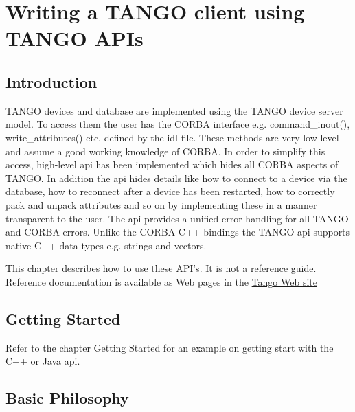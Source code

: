 
\chapter{Writing a TANGO client using TANGO APIs}

\section{Introduction}

\noindent TANGO devices and database are implemented using the TANGO
device server model. To access them the user has the CORBA interface
e.g. command\_inout(), write\_attributes() etc. defined by the idl
file. These methods are very low-level and assume a good working knowledge
of CORBA. In order to simplify this access, high-level api has been
implemented which hides all CORBA aspects of TANGO. In addition the
api hides details like how to connect to a device via the database,
how to reconnect after a device has been restarted, how to correctly
pack and unpack attributes and so on by implementing these in a manner
transparent to the user. The api provides a unified error handling
for all TANGO and CORBA errors. Unlike the CORBA C++ bindings the
TANGO api supports native C++ data types e.g. strings and vectors.

This chapter describes how to use these API's. It is not a reference
guide. Reference documentation is available as Web pages in the \href{http://www.tango-controls.org}{Tango Web site}

\section{Getting Started}

Refer to the chapter \textquotedbl{}Getting Started\textquotedbl{}
for an example on getting start with the C++ or Java api.

\section{Basic Philosophy}

